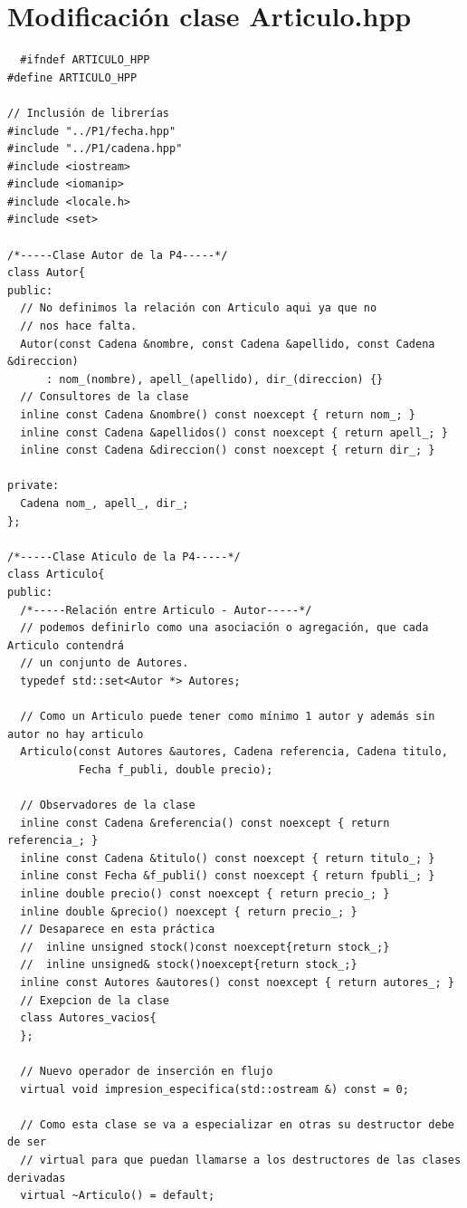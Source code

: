 \section{Modificación clase Articulo.hpp}
\begin{verbatim}
  #ifndef ARTICULO_HPP
#define ARTICULO_HPP

// Inclusión de librerías
#include "../P1/fecha.hpp"
#include "../P1/cadena.hpp"
#include <iostream>
#include <iomanip>
#include <locale.h>
#include <set>

/*-----Clase Autor de la P4-----*/
class Autor{
public:
  // No definimos la relación con Articulo aqui ya que no
  // nos hace falta.
  Autor(const Cadena &nombre, const Cadena &apellido, const Cadena &direccion)
      : nom_(nombre), apell_(apellido), dir_(direccion) {}
  // Consultores de la clase
  inline const Cadena &nombre() const noexcept { return nom_; }
  inline const Cadena &apellidos() const noexcept { return apell_; }
  inline const Cadena &direccion() const noexcept { return dir_; }

private:
  Cadena nom_, apell_, dir_;
};

/*-----Clase Aticulo de la P4-----*/
class Articulo{
public:
  /*-----Relación entre Articulo - Autor-----*/
  // podemos definirlo como una asociación o agregación, que cada Articulo contendrá
  // un conjunto de Autores.
  typedef std::set<Autor *> Autores;

  // Como un Articulo puede tener como mínimo 1 autor y además sin autor no hay articulo
  Articulo(const Autores &autores, Cadena referencia, Cadena titulo,
           Fecha f_publi, double precio);

  // Observadores de la clase
  inline const Cadena &referencia() const noexcept { return referencia_; }
  inline const Cadena &titulo() const noexcept { return titulo_; }
  inline const Fecha &f_publi() const noexcept { return fpubli_; }
  inline double precio() const noexcept { return precio_; }
  inline double &precio() noexcept { return precio_; }
  // Desaparece en esta práctica
  //  inline unsigned stock()const noexcept{return stock_;}
  //  inline unsigned& stock()noexcept{return stock_;}
  inline const Autores &autores() const noexcept { return autores_; }
  // Exepcion de la clase
  class Autores_vacios{
  };

  // Nuevo operador de inserción en flujo
  virtual void impresion_especifica(std::ostream &) const = 0;

  // Como esta clase se va a especializar en otras su destructor debe de ser
  // virtual para que puedan llamarse a los destructores de las clases derivadas
  virtual ~Articulo() = default;


\end{verbatim}
